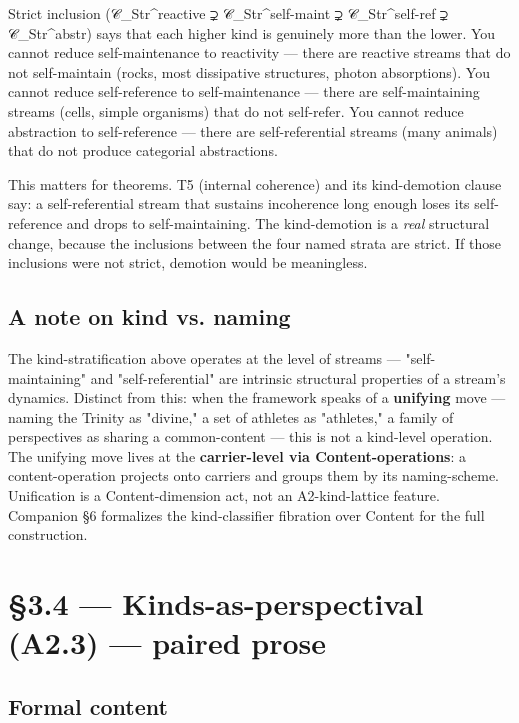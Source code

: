 \documentclass[11pt, openany]{book}
\newcommand{\sectionbreak}{\clearpage}
\begin{document}
Strict inclusion (𝒞\_\allowbreak{}Str\textasciicircum{}reactive ⊋ 𝒞\_\allowbreak{}Str\textasciicircum{}self-maint ⊋ 𝒞\_\allowbreak{}Str\textasciicircum{}self-ref ⊋ 𝒞\_\allowbreak{}Str\textasciicircum{}abstr) says that each higher kind is genuinely more than the lower. You cannot reduce self-maintenance to reactivity --- there are reactive streams that do not self-maintain (rocks, most dissipative structures, photon absorptions). You cannot reduce self-reference to self-maintenance --- there are self-maintaining streams (cells, simple organisms) that do not self-refer. You cannot reduce abstraction to self-reference --- there are self-referential streams (many animals) that do not produce categorial abstractions.

This matters for theorems. T5 (internal coherence) and its kind-demotion clause say: a self-referential stream that sustains incoherence long enough loses its self-reference and drops to self-maintaining. The kind-demotion is a \textit{real} structural change, because the inclusions between the four named strata are strict. If those inclusions were not strict, demotion would be meaningless.

\subsection{A note on kind vs. naming}

The kind-stratification above operates at the level of streams --- "self-maintaining" and "self-referential" are intrinsic structural properties of a stream's dynamics. Distinct from this: when the framework speaks of a \textbf{unifying} move --- naming the Trinity as "divine," a set of athletes as "athletes," a family of perspectives as sharing a common-content --- this is not a kind-level operation. The unifying move lives at the \textbf{carrier-level via Content-operations}: a content-operation projects onto carriers and groups them by its naming-scheme. Unification is a Content-dimension act, not an A2-kind-lattice feature. Companion §6 formalizes the kind-classifier fibration over Content for the full construction.

\sectionbreak

\section{§3.4 --- Kinds-as-perspectival (A2.3) --- paired prose}

\subsection{Formal content}
\end{document}
